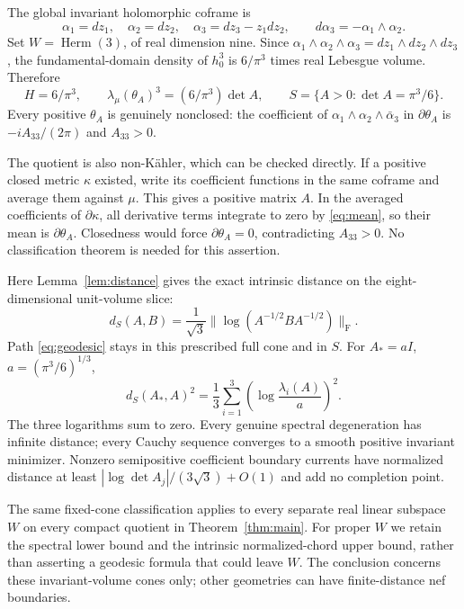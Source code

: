 \documentclass[11pt]{article}
\newcommand{\Herm}{\operatorname{Herm}}
\newcommand{\Frob}{\mathrm F}
\begin{document}
The global invariant holomorphic coframe is
\[
 \alpha_1=dz_1,\quad\alpha_2=dz_2,\quad
 \alpha_3=dz_3-z_1dz_2,\qquad
 d\alpha_3=-\alpha_1\wedge\alpha_2.
\]
Set $W=\Herm(3)$, of real dimension nine.
Since $\alpha_1\wedge\alpha_2\wedge\alpha_3=dz_1\wedge dz_2\wedge dz_3$,
the fundamental-domain density of $h_0^3$ is $6/\pi^3$ times real
Lebesgue volume. Therefore
\[
 H=6/\pi^3,\qquad \lambda_\mu(\theta_A)^3=(6/\pi^3)\det A,\qquad
 S=\{A>0:\det A=\pi^3/6\}.
\]
Every positive $\theta_A$ is genuinely nonclosed: the coefficient of
$\alpha_1\wedge\alpha_2\wedge\bar\alpha_3$ in $\partial\theta_A$
is $-iA_{33}/(2\pi)$ and $A_{33}>0$.

The quotient is also non-K\"ahler, which can be checked directly.
If a positive closed metric $\kappa$ existed, write its coefficient
functions in the same coframe and average them against $\mu$.
This gives a positive matrix $A$. In the averaged coefficients of
$\partial\kappa$, all derivative terms integrate to zero by
\eqref{eq:mean}, so their mean is $\partial\theta_A$.
Closedness would force $\partial\theta_A=0$, contradicting $A_{33}>0$.
No classification theorem is needed for this assertion.

Here Lemma~\ref{lem:distance} gives the exact intrinsic distance on the
eight-dimensional unit-volume slice:
\[
 d_S(A,B)=\frac1{\sqrt3}\|\log(A^{-1/2}BA^{-1/2})\|_\Frob.
\]
Path \eqref{eq:geodesic} stays in this prescribed full cone and in $S$.
For $A_*=aI$, $a=(\pi^3/6)^{1/3}$,
\[
 d_S(A_*,A)^2=\frac13\sum_{i=1}^3
                          \left(\log\frac{\lambda_i(A)}a\right)^2.
\]
The three logarithms sum to zero. Every genuine spectral degeneration
has infinite distance; every Cauchy sequence converges to a smooth
positive invariant minimizer. Nonzero semipositive coefficient boundary
currents have normalized distance at least
$|\log\det A_j|/(3\sqrt3)+O(1)$ and add no completion point.

The same fixed-cone classification applies to every separate real linear
subspace $W$ on every compact quotient in Theorem~\ref{thm:main}.
For proper $W$ we retain the spectral lower bound and the intrinsic
normalized-chord upper bound, rather than asserting a geodesic formula
that could leave $W$. The conclusion concerns these invariant-volume
cones only; other geometries can have finite-distance nef boundaries.
\end{document}
